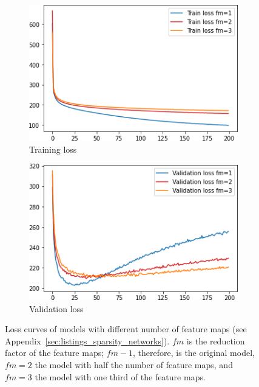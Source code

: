 \begin{figure}
    \centering
    \begin{subfigure}{.45\textwidth}
        \centering
        \includegraphics[width=\textwidth]{images/sparseness/sparseness_train_loss.png}
        \caption{Training loss}
    \end{subfigure}
    \hfill
    \begin{subfigure}{.45\textwidth}
        \centering
        \includegraphics[width=\textwidth]{images/sparseness/sparseness_validation_loss.png}
        \caption{Validation loss}
    \end{subfigure}
    \caption[Sparse Models - Loss Curves]{Loss curves of models with different number of feature maps (see Appendix~\ref{sec:listings_sparsity_networks}). $fm$ is the reduction factor of the feature maps; $fm-1$, therefore, is the original model, $fm=2$ the model with half the number of feature maps, and $fm=3$ the model with one third of the feature maps.}
    \label{fig:learning_curves_sparseness}
\end{figure}

